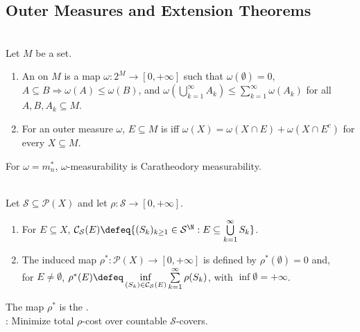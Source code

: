 \subsection{Outer Measures and Extension Theorems}

\begin{definition} \label{def:abstract-outer-measure-clean-division} \\
Let $M$ be a set.
\begin{enumerate}[label=(\roman*)]
\setlength{\itemsep}{0pt}
\item An  on $M$ is a map $\omega:2^M\to[0,+\infty]$ such that $\omega(\emptyset)=0$, $A\subseteq B\Rightarrow\omega(A)\leq\omega(B)$, and $\omega(\bigcup_{k=1}^{\infty}A_k)\leq\sum_{k=1}^{\infty}\omega(A_k)$ for all $A,B,A_k\subseteq M$.
\item For an outer measure $\omega$, $E\subseteq M$ is  iff $\omega(X)=\omega(X\cap E)+\omega(X\cap E^c)$ for every $X\subseteq M$.
\end{enumerate}
For $\omega=m_n^\ast$, $\omega$-measurability is Caratheodory measurability.
\end{definition}

\begin{definition} \label{def:cover-induced-outer-measure} \\
Let $\mathcal{S}\subseteq\mathcal{P}(X)$ and let $\rho:\mathcal{S}\to[0,+\infty]$.
\begin{enumerate}[label=(\roman*)]
\setlength{\itemsep}{0pt}
\item For $E\subseteq X$, $\mathcal{C}_{\mathcal{S}}(E)\defeq\{(S_k)_{k\geq1}\in\mathcal{S}^{\N}:E\subseteq\bigcup\limits_{k=1}^{\infty}S_k\}$.
\item The induced map $\rho^\ast:\mathcal{P}(X)\to[0,+\infty]$ is defined by $\rho^\ast(\emptyset)=0$ and,\\
for $E\neq\emptyset$, $\rho^\ast(E)\defeq\inf\limits_{(S_k)\in\mathcal{C}_{\mathcal{S}}(E)}\sum\limits_{k=1}^{\infty}\rho(S_k)$, with $\inf\emptyset=+\infty$.
\end{enumerate}
The map $\rho^\ast$ is the .\\
: Minimize total $\rho$-cost over countable $\mathcal{S}$-covers.
\end{definition}

